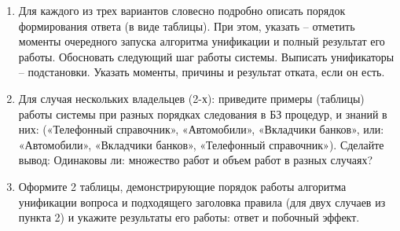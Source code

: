 \begin{enumerate}
	\item Для каждого из трех вариантов словесно подробно описать порядок формирования ответа (в виде таблицы). При этом, указать – отметить моменты очередного запуска алгоритма унификации и полный результат его работы. Обосновать следующий шаг работы системы. Выписать унификаторы – подстановки. Указать моменты, причины и результат отката, если он есть.
	\item Для случая нескольких владельцев (2-х): 
	приведите примеры (таблицы) работы системы при разных порядках следования в БЗ  процедур, и знаний в них: («Телефонный справочник», «Автомобили», «Вкладчики банков», или: «Автомобили», «Вкладчики банков», «Телефонный справочник»). Сделайте вывод: Одинаковы ли: множество работ и объем работ в разных случаях?
	\item Оформите 2 таблицы, демонстрирующие порядок работы алгоритма унификации вопроса и подходящего заголовка правила (для двух случаев из пункта 2) и укажите результаты его работы: ответ и побочный эффект.
\end{enumerate}


